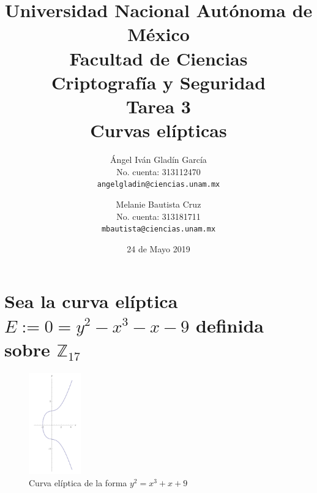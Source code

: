 \documentclass[11pt,letterpaper]{article}
\newcommand{\Z}{\mathbb{Z}}
\begin{document}
\title{
    \vspace{-2cm}
        Universidad Nacional Autónoma de México\\
        Facultad de Ciencias\\
        Criptografía y Seguridad\\
    \vspace{.5cm}
    \large
        \textbf{Tarea 3}\\
        \textbf{Curvas elípticas}
}
\author{
    Ángel Iván Gladín García\\
    No. cuenta: 313112470\\
    \texttt{angelgladin@ciencias.unam.mx}
    \and
    Melanie Bautista Cruz\\
    No. cuenta: 313181711\\
    \texttt{mbautista@ciencias.unam.mx}
}
\date{24 de Mayo 2019}
\maketitle

\newtheorem{theorem}{Teorema}
\newtheorem{example}{Ejemplo}
\newtheorem{corollary}{Corolario}
\newtheorem{lemma}{Lemma}
\newtheorem{definition}{Definición}
\newtheorem{prop}{Proposición}



\section{Sea la curva elíptica $E := 0 = y^2 - x^3 - x - 9$ definida sobre $\Z_{17}$}

\begin{figure}[H]
\centering
\includegraphics[width=0.2\textwidth]{assets/curva.png}
\caption{Curva elíptica de la forma $y^2 = x^3 + x + 9$}
\end{figure}
\end{document}
